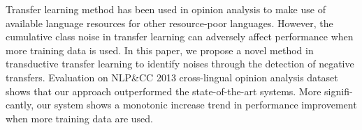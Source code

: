 Transfer learning method has been used in opinion analysis to make use of available language resources for other resource-poor languages. However, the cumulative class noise in transfer learning can adversely affect performance when more training data is used. In this paper, we propose a novel method in transductive transfer learning to identify noises through the detection of negative transfers. Evaluation on NLP\&CC 2013 cross-lingual opinion analysis dataset shows that our approach outperformed the state-of-the-art systems. More signifi-cantly, our system shows a monotonic increase trend in performance improvement when more training data are used.
